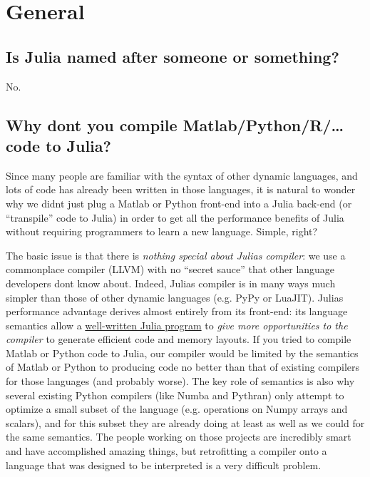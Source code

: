 \hypertarget{13603481244956250670}{}


\section{General}



\hypertarget{4693498942886852861}{}


\subsection{Is Julia named after someone or something?}



No.



\hypertarget{5072634749249852737}{}


\subsection{Why don{\textquotesingle}t you compile Matlab/Python/R/… code to Julia?}



Since many people are familiar with the syntax of other dynamic languages, and lots of code has already been written in those languages, it is natural to wonder why we didn{\textquotesingle}t just plug a Matlab or Python front-end into a Julia back-end (or “transpile” code to Julia) in order to get all the performance benefits of Julia without requiring programmers to learn a new language.  Simple, right?



The basic issue is that there is \emph{nothing special about Julia{\textquotesingle}s compiler}: we use a commonplace compiler (LLVM) with no “secret sauce” that other language developers don{\textquotesingle}t know about.  Indeed, Julia{\textquotesingle}s compiler is in many ways much simpler than those of other dynamic languages (e.g. PyPy or LuaJIT).   Julia{\textquotesingle}s performance advantage derives almost entirely from its front-end: its language semantics allow a \hyperlink{818954303942149020}{well-written Julia program} to \emph{give more opportunities to the compiler} to generate efficient code and memory layouts.  If you tried to compile Matlab or Python code to Julia, our compiler would be limited by the semantics of Matlab or Python to producing code no better than that of existing compilers for those languages (and probably worse).  The key role of semantics is also why several existing Python compilers (like Numba and Pythran) only attempt to optimize a small subset of the language (e.g. operations on Numpy arrays and scalars), and for this subset they are already doing at least as well as we could for the same semantics.  The people working on those projects are incredibly smart and have accomplished amazing things, but retrofitting a compiler onto a language that was designed to be interpreted is a very difficult problem.



